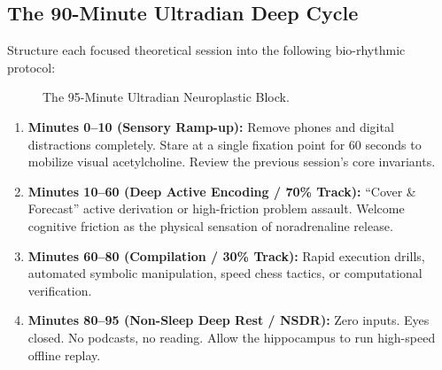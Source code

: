 \documentclass[11pt,a4paper]{article}
\begin{document}
\subsection{The 90-Minute Ultradian Deep Cycle}
Structure each focused theoretical session into the following bio-rhythmic protocol:

\begin{figure}[h!]
\centering
{}
\caption{The 95-Minute Ultradian Neuroplastic Block.}
\end{figure}

\begin{enumerate}
    \item \textbf{Minutes 0--10 (Sensory Ramp-up):} Remove phones and digital distractions completely. Stare at a single fixation point for 60 seconds to mobilize visual acetylcholine. Review the previous session's core invariants.
    \item \textbf{Minutes 10--60 (Deep Active Encoding / 70\% Track):} ``Cover \& Forecast'' active derivation or high-friction problem assault. Welcome cognitive friction as the physical sensation of noradrenaline release.
    \item \textbf{Minutes 60--80 (Compilation / 30\% Track):} Rapid execution drills, automated symbolic manipulation, speed chess tactics, or computational verification.
    \item \textbf{Minutes 80--95 (Non-Sleep Deep Rest / NSDR):} Zero inputs. Eyes closed. No podcasts, no reading. Allow the hippocampus to run high-speed offline replay.
\end{enumerate}
\end{document}
